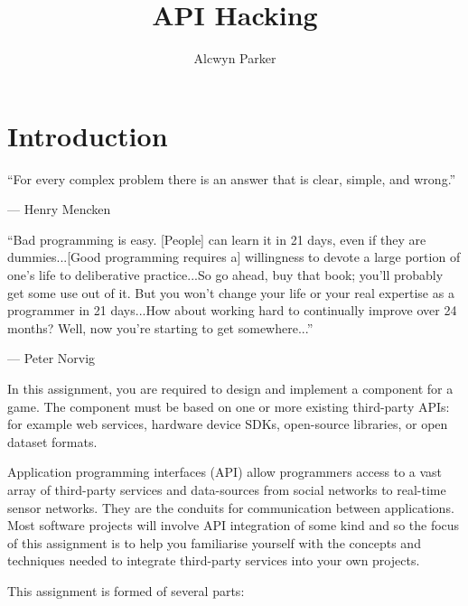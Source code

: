 \documentclass{../fal_assignment}
\title{API Hacking}
\author{Alcwyn Parker}
\begin{document}
\maketitle

\section*{Introduction}

\begin{marginquote}
``For every complex problem there is an answer that is clear, simple, and wrong.''

--- Henry Mencken

\marginquoterule

``Bad programming is easy. [People] can learn it in 21 days, even if they are dummies...[Good programming requires a] willingness to devote a large portion of one's life to deliberative practice...So go ahead, buy that book; you'll probably get some use out of it. But you won't change your life or your real expertise as a programmer in 21 days...How about working hard to continually improve over 24 months? Well, now you're starting to get somewhere...''
\par --- Peter Norvig

\end{marginquote}

In this assignment, you are required to design and implement a component for a game. The component must be based on one or more existing third-party APIs: for example web services, hardware device SDKs, open-source libraries, or open dataset formats. 

Application programming interfaces (API) allow programmers access to a vast array of third-party services and data-sources from social networks to real-time sensor networks. They are the conduits for communication between applications. Most software projects will involve API integration of some kind and so the focus of this assignment is to help you familiarise yourself with the concepts and techniques needed to integrate third-party services into your own projects.

This assignment is formed of several parts:
\end{document}

